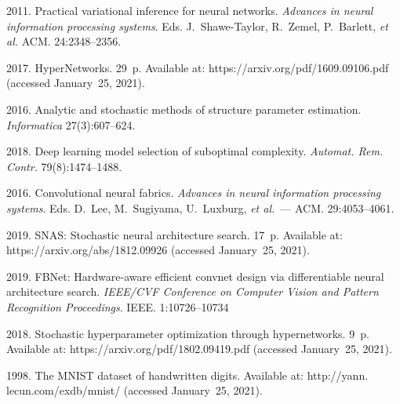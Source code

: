   \begin{multicols}{2}

\renewcommand{\bibname}{\protect\rmfamily References}

{\small\frenchspacing
 {%
 \begin{thebibliography}{9}

 2011. Practical variational inference for neural 
networks. \textit{Advances in neural information processing systems}.
Eds. J.~Shawe-Taylor, R.~Zemel, P.~Barlett, \textit{et al.}
ACM. 24:2348--2356.
    
 2017. HyperNetworks. 29~p. Available at: {\sf https://arxiv.org/pdf/1609.09106.pdf} (accessed January~25, 2021).
    
 2016. Analytic and stochastic methods of structure parameter estimation. 
 \textit{Informatica} 27(3):607--624. 
    
2018. Deep learning model selection of suboptimal complexity. 
\textit{Automat. Rem. Contr.} 79(8):1474--1488.
    
 2016. Convolutional neural fabrics. \textit{Advances 
in neural information processing systems}.  Eds. D.~Lee, M.~Sugiyama, U.~Luxburg, \textit{et al.}~---
ACM. 29:4053--4061.

 2019. SNAS: Stochastic neural architecture search. 17~p. 
 Available at: {\sf https://arxiv.org/abs/1812.09926} (accessed January~25, 2021).
    
 2019. FBNet: Hardware-aware efficient convnet design via differentiable neural architecture search. 
 \textit{IEEE/CVF Conference on Computer Vision and Pattern Recognition Proceedings}.
  IEEE. 1:10726--10734
    
 2018. Stochastic hyperparameter optimization through hypernetworks. 9~p. 
 Available at: {\sf https://arxiv.org/pdf/1802.09419.pdf} (accessed January~25, 2021).

 1998. The MNIST dataset of handwritten digits. Available at: 
 {\sf http://yann. lecun.com/exdb/mnist/} (accessed January~25, 2021).
\end{thebibliography}

 }
 }

\end{multicols}

